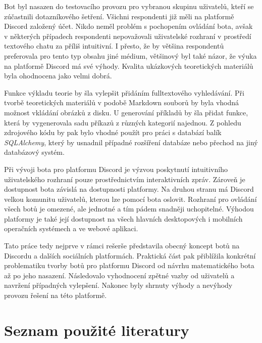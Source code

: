 \documentclass[FM]{tulthesis}
\begin{document}
	Bot byl nasazen do testovacího provozu pro vybranou skupinu uživatelů, kteří se zúčastnili dotazníkového šetření. Všichni respondenti již měli na platformě Discord založený účet. Nikdo neměl problém s pochopením ovládání bota, avšak v některých případech respondenti nepovažovali uživatelské rozhraní v prostředí textového chatu za příliš intuitivní. I přesto, že by většina respondentů preferovala pro tento typ obsahu jiné médium, většinový byl také názor, že výuka na platformě Discord má své výhody. Kvalita ukázkových teoretických materiálů byla ohodnocena jako velmi dobrá.
	
	Funkce výkladu teorie by šla vylepšit přidáním fulltextového vyhledávání. Při tvorbě teoretických materiálů v podobě Markdown souborů by byla vhodná možnost vkládání obrázků z disku. U generování příkladů by šla přidat funkce, která by vygenerovala sadu příkazů z různých kategorií najednou. Z pohledu zdrojového kódu by pak bylo vhodné použít pro práci s databází balík \textit{SQLAlchemy}, který by usnadnil případné rozšíření databáze nebo přechod na jiný databázový systém.
	
	Při vývoji bota pro platformu Discord je výzvou poskytnutí intuitivního uživatelského rozhraní pouze prostřednictvím interaktivních zpráv. Zároveň je dostupnost bota závislá na dostupnosti platformy. Na druhou stranu má Discord velkou komunitu uživatelů, kterou lze pomocí bota oslovit. Rozhraní pro ovládání všech botů je omezené, ale jednotné a tím pádem snadněji uchopitelné. Výhodou platformy je také její dostupnost na všech hlavních desktopových i mobilních operačních systémech a ve webové aplikaci.
	
	Tato práce tedy nejprve v rámci rešerše představila obecný koncept botů na Discordu a dalších sociálních platformách. Praktická část pak přiblížila konkrétní problematiku tvorby botů pro platformu Discord od návrhu matematického bota až po jeho nasazení. Následovalo vyhodnocení zpětné vazby od uživatelů a navržení případných vylepšení. Nakonec byly shrnuty výhody a nevýhody provozu řešení na této platformě.

	\chapter*{Seznam použité literatury}
	\printbibliography[heading=none]
	
	\appendix	
\end{document}
